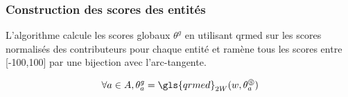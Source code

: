 \subsubsection{Construction des scores des entités}

L'algorithme calcule les scores globaux $\theta^g$ en utilisant \gls{qrmed} sur les scores normalisés des contributeurs pour chaque entité et ramène tous les scores entre [-100,100] par une bijection avec l'arc-tangente.

\begin{equation}
    \forall a \in A , \theta^g_a=\gls{qrmed}_{2W}(w,\theta^\circledS_a)
\end{equation}


\pagebreak

